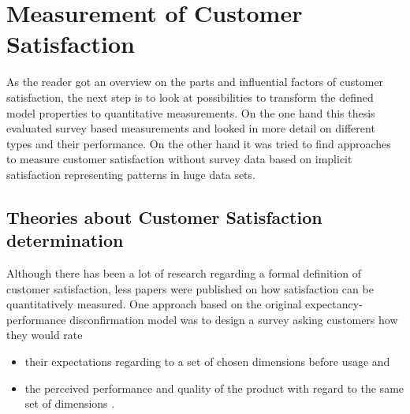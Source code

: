 \section{Measurement of Customer Satisfaction}
As the reader got an overview on the parts and influential factors of customer satisfaction, the next step is to look at possibilities to transform the defined model properties to quantitative measurements. On the one hand this thesis evaluated survey based measurements and looked in more detail on different types and their performance. On the other hand it was tried to find approaches to measure customer satisfaction without survey data based on implicit satisfaction representing patterns in huge data sets. 

\subsection{Theories about Customer Satisfaction determination}
\label{ssec:custSatTheories}
Although there has been a lot of research regarding a formal definition of customer satisfaction, less papers were published on how satisfaction can be quantitatively measured. One approach based on the original expectancy-performance disconfirmation model was to design a survey asking customers how they would rate

\begin{itemize}
	\item their expectations regarding to a set of chosen dimensions before usage and
	\item the perceived performance and quality of the product with regard to the same set of dimensions \cite{prakash1983reliability}.
\end{itemize}

